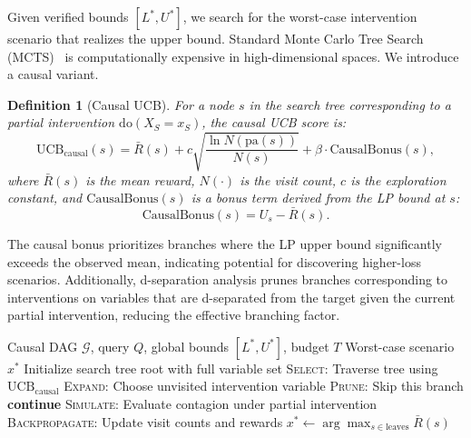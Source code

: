 \documentclass[11pt,a4paper]{article}
\newtheorem{definition}[theorem]{Definition}
\newcommand{\doOp}{\mathrm{do}}
\newcommand{\calG}{\mathcal{G}}
\newcommand{\pa}{\mathrm{pa}}
\begin{document}
Given verified bounds $[L^*, U^*]$, we search for the worst-case intervention scenario that realizes the upper bound. Standard Monte Carlo Tree Search (MCTS)~\citep{kocsis2006bandit} is computationally expensive in high-dimensional spaces. We introduce a causal variant.

\begin{definition}[Causal UCB]
\label{def:causal-ucb}
For a node $s$ in the search tree corresponding to a partial intervention $\doOp(X_S = x_S)$, the causal UCB score is:
\begin{equation}
\text{UCB}_{\text{causal}}(s) = \bar{R}(s) + c \sqrt{\frac{\ln N(\pa(s))}{N(s)}} + \beta \cdot \text{CausalBonus}(s),
\end{equation}
where $\bar{R}(s)$ is the mean reward, $N(\cdot)$ is the visit count, $c$ is the exploration constant, and $\text{CausalBonus}(s)$ is a bonus term derived from the LP bound at $s$:
\begin{equation}
\text{CausalBonus}(s) = U_s - \bar{R}(s).
\end{equation}
\end{definition}

The causal bonus prioritizes branches where the LP upper bound significantly exceeds the observed mean, indicating potential for discovering higher-loss scenarios. Additionally, d-separation analysis prunes branches corresponding to interventions on variables that are d-separated from the target given the current partial intervention, reducing the effective branching factor.

\begin{algorithm}[t]
\caption{MCTS with Causal UCB}
\label{alg:mcts}
\begin{algorithmic}[1]
\REQUIRE Causal DAG $\calG$, query $Q$, global bounds $[L^*, U^*]$, budget $T$
\ENSURE Worst-case scenario $x^*$
\STATE Initialize search tree root with full variable set
    \STATE \textsc{Select}: Traverse tree using $\text{UCB}_{\text{causal}}$
    \STATE \textsc{Expand}: Choose unvisited intervention variable
    \IF{$\text{d-separated}(X_{\text{new}}, Y \mid X_S)$ in $\calG$}
        \STATE \textsc{Prune}: Skip this branch
        \STATE \textbf{continue}
    \ENDIF
    \STATE \textsc{Simulate}: Evaluate contagion under partial intervention
    \STATE \textsc{Backpropagate}: Update visit counts and rewards
\ENDFOR
\RETURN $x^* \leftarrow \arg\max_{s \in \text{leaves}} \bar{R}(s)$
\end{algorithmic}
\end{algorithm}
\end{document}
